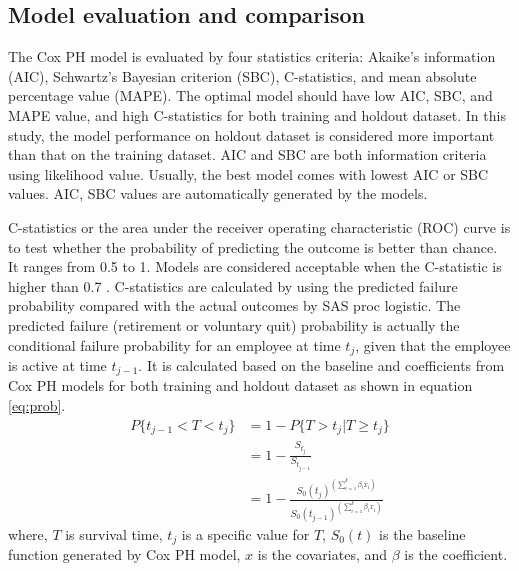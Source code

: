 \documentclass[12pt,letterpaper]{article}
\begin{document}
\subsection{Model evaluation and comparison}

The Cox PH model is evaluated by four statistics criteria:  Akaike’s information (AIC), Schwartz’s Bayesian criterion (SBC), C-statistics, and mean absolute percentage value (MAPE). The optimal model should have low AIC, SBC, and MAPE value, and high C-statistics for both training and holdout dataset. In this study, the model performance on holdout dataset is considered more important than that on the training dataset.  AIC and SBC are both information criteria using likelihood value. Usually, the best model comes with lowest AIC or SBC values. AIC, SBC values are automatically generated by the models.

C-statistics or the area under the receiver operating characteristic (ROC) curve is to test whether the probability of predicting the outcome is better than chance. It ranges from 0.5 to 1.  Models are considered acceptable when the C-statistic is higher than 0.7 \citep{hosmer2013}. C-statistics are calculated by using the predicted failure probability compared with the actual outcomes by SAS proc logistic. The predicted failure (retirement or voluntary quit) probability is actually the conditional failure probability for an employee at time $t_j$, given that the employee is active at time $t_{j-1}$. It is calculated based on the baseline and coefficients from Cox PH models for both training and holdout dataset as shown in equation \ref{eq:prob}.
\begin{equation}
\label{eq:prob}
\begin{split}%
P\{t_{j-1}<T<t_j\} &=1-P\{T>t_j|T \ge t_j\}\\
&=1-\frac{S_{t_j}}{S_{t_{j-1}}}   \\
&=1-\frac{{S_0(t_j)}^{(\sum_{i=1}^{k}\beta_ix_i)}}{   {S_0(t_{j-1})}^{(\sum_{i=1}^{k}\beta_ix_i)}}
\end{split}
\end{equation}
where, $T$ is survival time, $t_j$ is a specific value for $T$, $S_0(t)$ is the baseline function generated by Cox PH model, $x$ is the covariates, and $\beta$ is the coefficient.
\end{document}
